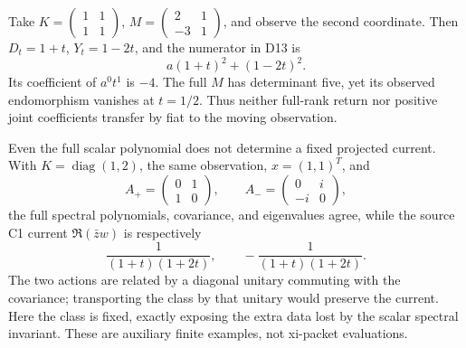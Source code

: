 Take \(K=\left(\begin{smallmatrix}1&1\\1&1\end{smallmatrix}\right)\), \(M=\left(\begin{smallmatrix}2&1\\-3&1\end{smallmatrix}\right)\), and observe the second coordinate. Then \(D_t=1+t\), \(Y_t=1-2t\), and the numerator in D13 is \[
 a(1+t)^2+(1-2t)^2.
 \tag{D14}
\] Its coefficient of \(a^0t^1\) is \(-4\). The full \(M\) has determinant five, yet its observed endomorphism vanishes at \(t=1/2\). Thus neither full-rank return nor positive joint coefficients transfer by fiat to the moving observation.

Even the full scalar polynomial does not determine a fixed projected current. With \(K=\operatorname{diag}(1,2)\), the same observation, \(x=(1,1)^T\), and \[
 A_+=\begin{pmatrix}0&1\\1&0\end{pmatrix},\qquad
 A_-=\begin{pmatrix}0&i\\-i&0\end{pmatrix},
\] the full spectral polynomials, covariance, and eigenvalues agree, while the source C1 current \(\Re(\bar z w)\) is respectively \[
 \frac{1}{(1+t)(1+2t)},\qquad -\frac{1}{(1+t)(1+2t)}.
 \tag{D15}
\] The two actions are related by a diagonal unitary commuting with the covariance; transporting the class by that unitary would preserve the current. Here the class is fixed, exactly exposing the extra data lost by the scalar spectral invariant. These are auxiliary finite examples, not xi-packet evaluations.
